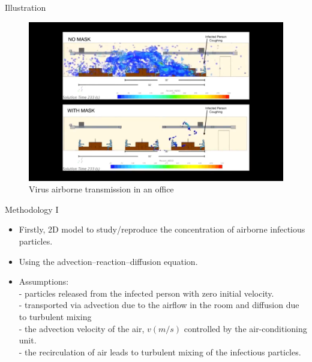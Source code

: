 \documentclass[10pt]{beamer}
\begin{document}
\begin{frame}{Illustration}
        \begin{figure}
            \includegraphics[width=\textwidth]{illu.png}
            \caption{Virus airborne transmission in an office }
        \end{figure}  
\end{frame}

\begin{frame}{Methodology I}
    \begin{itemize}
        \item Firstly, 2D model to study/reproduce the concentration of airborne infectious particles.
        \item Using the advection–reaction–diffusion equation.
        \item Assumptions: \\- particles  released from
        the infected person with zero initial velocity.
        \\ - transported via advection due to the airflow in the room and diffusion due to turbulent mixing
        \\ - the advection velocity of the air, $v (m/s)$ controlled by the air-conditioning unit.
        \\ -  the recirculation of air leads to turbulent mixing of the infectious particles.  
    \end{itemize}  

\end{frame}
\end{document}
